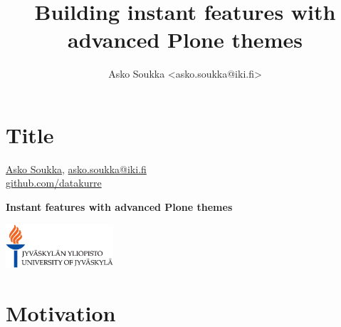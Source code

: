 \documentclass[aspectratio=43]{beamer}
\title{Building instant features with advanced Plone themes}
\author{Asko Soukka <asko.soukka@iki.fi>}
\begin{document}
\section{Title}


\begin{frame}[plain,t]
  \vspace{2em}
  \centering
  \href{http://iki.fi/asko.soukka/}{Asko Soukka},
  \href{mailto:asko.soukka@iki.fi}{asko.soukka@iki.fi}\\
  \href{https://github.com/datakure/}{github.com/datakurre}
  \par
  \vspace{3em}
  \Huge
  \bfseries
  Instant features with advanced Plone themes
  \par
  \vspace{2em}
  \href{https://www.jyu.fi/}{\includegraphics[width=4cm]{images/logo.eps}}
\end{frame}

\section{Motivation}
\end{document}
